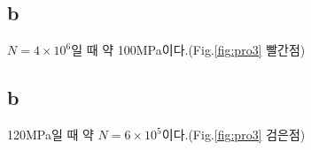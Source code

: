 \documentclass[a4paper]{oblivoir}
\begin{document}
\subsection{b}
$N = 4\times10^{6}$일 때 약 100MPa이다.(Fig.\ref{fig:pro3} 빨간점)

\subsection{b}
120MPa일 때 약 $N = 6\times10^{5}$이다.(Fig.\ref{fig:pro3} 검은점)
\end{document}
